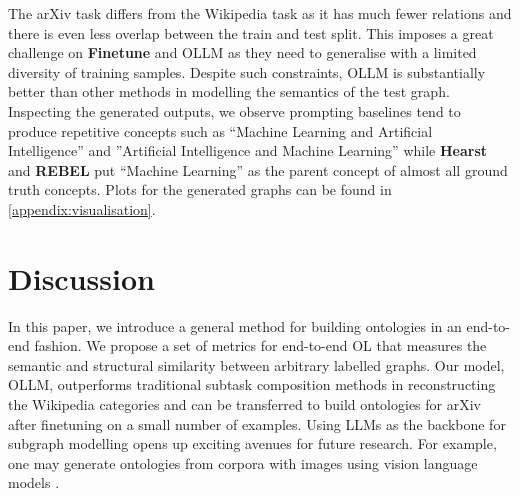 \documentclass{article}
\newcommand{\name}{{OLLM}\xspace}
\begin{document}
The arXiv task differs from the Wikipedia task as it has much fewer relations and there is even less overlap between the train and test split. This imposes a great challenge on \textbf{Finetune} and \name as they need to generalise with a limited diversity of training samples. Despite such constraints, \name is substantially better than other methods in modelling the semantics of the test graph. Inspecting the generated outputs, we observe prompting baselines tend to produce repetitive concepts such as ``Machine Learning and Artificial Intelligence'' and ''Artificial Intelligence and Machine Learning'' while \textbf{Hearst} and \textbf{REBEL} put ``Machine Learning'' as the parent concept of almost all ground truth concepts. Plots for the generated graphs can be found in \cref{appendix:visualisation}. 





\section{Discussion}

In this paper, we introduce a general method for building ontologies in an end-to-end fashion. We propose a set of metrics for end-to-end OL that measures the semantic and structural similarity between arbitrary labelled graphs. Our model, \name, outperforms traditional subtask composition methods in reconstructing the Wikipedia categories and can be transferred to build ontologies for arXiv after finetuning on a small number of examples. Using LLMs as the backbone for subgraph modelling opens up exciting avenues for future research. For example, one may generate ontologies from corpora with images using vision language models \cite{donahue2015long}.
\end{document}
